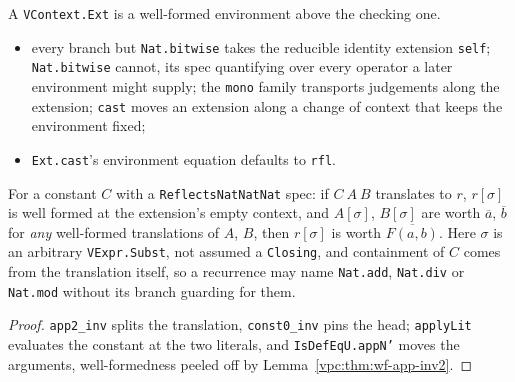 \begin{definition}
\label{vpc:struct:vcontext-ext}
\leanok
{}

 A \texttt{VContext.Ext} is a well-formed environment above the checking one.
\begin{itemize}
\item every branch but \texttt{Nat.bitwise} takes the reducible identity extension
\texttt{self}; \texttt{Nat.bitwise} cannot, its spec quantifying over every operator a later
environment might supply; the \texttt{mono} family transports judgements along the extension;
\texttt{cast} moves an extension along a change of context that keeps the environment fixed;
\item {} \texttt{Ext.cast}'s environment equation defaults to \texttt{rfl}.
\end{itemize}
\end{definition}

\begin{theorem}
\label{vpc:thm:ext-natbinlittr}\leanok
{}

 For a constant $C$ with a \texttt{ReflectsNatNatNat} spec: if $C\ A\ B$
translates to $r$, $r[\sigma]$ is well formed at the extension's empty context, and $A[\sigma]$,
$B[\sigma]$ are worth $\overline{a}$, $\overline{b}$ for \emph{any} well-formed translations of
$A$, $B$, then $r[\sigma]$ is worth $\overline{F(a,b)}$. Here $\sigma$ is an arbitrary
\texttt{VExpr.Subst}, not assumed a \texttt{Closing}, and containment of $C$ comes from the
translation itself, so a recurrence may name \texttt{Nat.add}, \texttt{Nat.div} or
\texttt{Nat.mod} without its branch guarding for them.
\end{theorem}
\begin{proof}\leanok
{}
 \texttt{app2\_inv} splits the translation, \texttt{const0\_inv} pins the head;
\texttt{applyLit} evaluates the constant at the two literals, and \texttt{IsDefEqU.appN'} moves
the arguments, well-formedness peeled off by Lemma~\ref{vpc:thm:wf-app-inv2}.
\end{proof}

